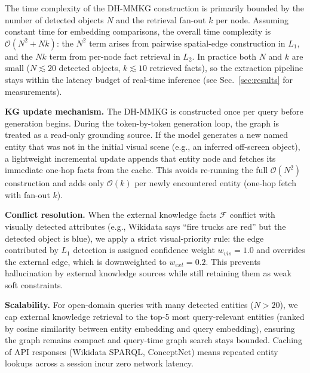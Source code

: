 The time complexity of the DH-MMKG construction is primarily bounded by the number of detected objects $N$ and the retrieval fan-out $k$ per node. Assuming constant time for embedding comparisons, the overall time complexity is $\mathcal{O}(N^2 + N k)$: the $N^2$ term arises from pairwise spatial-edge construction in $L_1$, and the $N k$ term from per-node fact retrieval in $L_2$. In practice both $N$ and $k$ are small ($N \lesssim 20$ detected objects, $k \lesssim 10$ retrieved facts), so the extraction pipeline stays within the latency budget of real-time inference (see Sec.~\ref{sec:results} for measurements).

\noindent\textbf{KG update mechanism.} The DH-MMKG is constructed once per query before generation begins. During the token-by-token generation loop, the graph is treated as a read-only grounding source. If the model generates a new named entity that was not in the initial visual scene (e.g., an inferred off-screen object), a lightweight incremental update appends that entity node and fetches its immediate one-hop facts from the cache. This avoids re-running the full $\mathcal{O}(N^2)$ construction and adds only $\mathcal{O}(k)$ per newly encountered entity (one-hop fetch with fan-out $k$).

\noindent\textbf{Conflict resolution.} When the external knowledge facts $\mathcal{F}$ conflict with visually detected attributes (e.g., Wikidata says ``fire trucks are red'' but the detected object is blue), we apply a strict visual-priority rule: the edge contributed by $L_1$ detection is assigned confidence weight $w_{vis} = 1.0$ and overrides the external edge, which is downweighted to $w_{ext} = 0.2$. This prevents hallucination by external knowledge sources while still retaining them as weak soft constraints.

\noindent\textbf{Scalability.} For open-domain queries with many detected entities ($N > 20$), we cap external knowledge retrieval to the top-5 most query-relevant entities (ranked by cosine similarity between entity embedding and query embedding), ensuring the graph remains compact and query-time graph search stays bounded. Caching of API responses (Wikidata SPARQL, ConceptNet) means repeated entity lookups across a session incur zero network latency.

